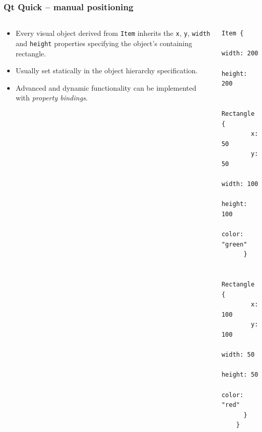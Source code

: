 \begin{frame}[fragile]
  \frametitle{Qt Quick -- manual positioning}
  \small
  \begin{columns}
    \begin{column}{0.5\textwidth}
    \begin{itemize}
      \item Every visual object derived from \texttt{Item} inherits the
        \texttt{x}, \texttt{y}, \texttt{width} and \texttt{height} properties
        specifying the object's containing rectangle.
      \item Usually set statically in the object hierarchy specification.
      \item Advanced and dynamic functionality can be implemented with
        {\em property bindings}.
    \end{itemize}
    \end{column}
    \begin{column}{0.5\textwidth}
    \begin{lstlisting}[basicstyle=\scriptsize\ttfamily]
	Item {
	  width: 200
	  height: 200

	  Rectangle {
	    x: 50
	    y: 50
	    width: 100
	    height: 100
	    color: "green"
	  }

	  Rectangle {
	    x: 100
	    y: 100
	    width: 50
	    height: 50
	    color: "red"
	  }
	}
    \end{lstlisting}
    \end{column}
  \end{columns}
\end{frame}

